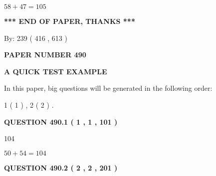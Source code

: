 \documentclass[12pt]{article}
\begin{document}
$ %
58 +  %
47=   %
105$
 
 
   
   
 \vspace{0.2in}
 
   
   
   
   
\vspace{1.0in} 
{\textbf{\large{ *** END OF PAPER, THANKS *** }}} 
   
   
\hspace{1.0in} By: 
 239 ( 416 ,  613 )
   
   
   
   
\newpage 
\setcounter{page}{ 
   490001 } 
   
   
   
   
 {\textbf{ \Large{ PAPER NUMBER  490  }}}
   
   
\vspace{0.2in}
   
   
   
   
   
   
 \vspace{0.2in}
{\LARGE {\textbf{ A QUICK TEST EXAMPLE}}}
   
   
   
\vspace{0.2in}
   
In this paper, big questions will be generated in the following order: 
   
   
   1 ( 1 )
 ,
   2 ( 2 )
 .
  
\vspace{0.2in}
  
{\textbf{\Large{QUESTION
490.1 
 ( 1 , 1 , 101 )
}}}
  
  
 
 
\noindent{}

104
 
 
 
 
\noindent{}

$ %
50 +  %
54=   %
104$
 
 
  
\vspace{0.2in}
  
{\textbf{\Large{QUESTION
490.2 
 ( 2 , 2 , 201 )
}}}
  
\end{document}
